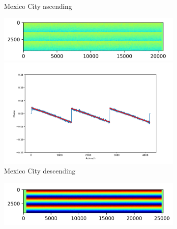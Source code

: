 \documentclass[preprint, authoryear]{elsarticle}
\begin{document}
\begin{figure}
\begin{subfigure}{0.5\textwidth}
\begin{minipage}{0.5\textwidth}
        \end{minipage}
        \caption{Mexico City ascending}
        \label{fig_5c}
    \end{subfigure}%
    \begin{subfigure}{0.5\textwidth}
        \centering
        \begin{minipage}{0.5\textwidth}
            \centering
            \includegraphics[width=\textwidth]{figure/The cross-interferogram/cross_interf_Mexico_des.png}
        \end{minipage}%
        \begin{minipage}{0.5\textwidth}
            \centering
            \includegraphics[width=\textwidth]{figure/The cross-interferogram/cross_interf_Mexico_des_row&fitted_20230106.png}
        \end{minipage}
        \caption{Mexico City descending}
        \label{fig_5d}
    \end{subfigure}%
    \hfill
    \begin{subfigure}{0.5\textwidth}
        \centering
        \begin{minipage}{0.5\textwidth}
            \centering
            \includegraphics[width=\textwidth]{figure/The cross-interferogram/cross_interf_XiAn_asc.png}

\end{minipage}
\end{subfigure}
\end{figure}
\end{document}

